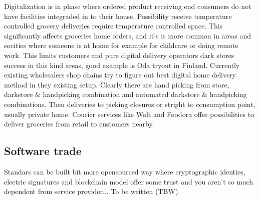 Digitalization is in phase where ordered product receiving end consumers do not
have facilities integraded in to their house. Possibility receive temperature
controlled grocery deliveries require temperature controlled space. This
significantly affects groceries home orders, and it's is more common in areas
and socities where someone is at home for example for childcare or doing remote
work. This limits customers and pure digital delivery operators dark stores
success in this kind areas, good example is Oda\cite{Oda} tryout in Finland.
Currently existing wholesalers shop chains try to figure out best digital home
delivery method in they existing setup. Clearly there are hand picking from
store, darkstore \& handpicking combination and automated darkstore \&
handpicking combinations. Then deliveries to picking closures or stright to
consumption point, usually private home. Courier services like Wolt\cite{Wolt}
and Foodora\cite{Foodora} offer possibilities to deliver groceries from retail
to customers nearby.

\subsection{Software trade}
\label{software_trade}

Standars can be built bit more opensourced way where cryptographic identies,
electric signatures and blockchain model offer some trust and you aren't so
much dependent from service provider... To be written (TBW).


